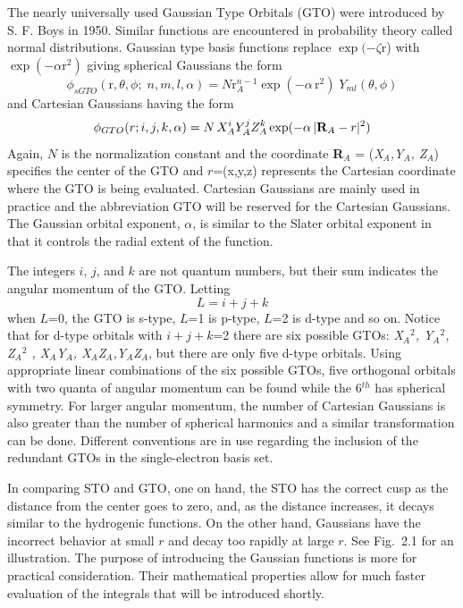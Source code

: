 \documentclass[11pt,oneside,final]{huthesis}%
\begin{document}
The nearly universally used Gaussian Type Orbitals (GTO) were introduced by S. F. Boys in 1950.  Similar functions are encountered in probability theory called normal distributions.  Gaussian type basis functions replace $\exp(-\zeta $r) with $\exp(-\alpha \textrm{r}^{2})$ giving spherical Gaussians the form 
\begin{equation*} %
	\phi _{sGTO} (\textrm{r},\theta ,\phi ;\; n,m,l,\alpha )=N\textrm{r}_{A}^{n-1} \exp (-\alpha \, \textrm{r}^{2} )\; Y_{ml} (\theta ,\phi ) 
\end{equation*} 
 and Cartesian Gaussians having the form
\begin{equation*} %
\phi _{GTO} ({ r};i,j,k,\alpha )=N\, X_{A}^{i} Y_{A}^{j} Z_{A}^{k} \exp (-\alpha \, |{\bf R}_{A} -{r}|^{2} )
\end{equation*}  
Again, $N$ is the normalization constant and the coordinate \textbf{R}${}_{A}$ = (\textit{X${}_{A}$,Y${}_{A}$, Z${}_{A}$}) specifies the center of the GTO and ${r}$=(x,y,z) represents the Cartesian coordinate where the GTO is being evaluated.  Cartesian Gaussians are mainly used in practice and the abbreviation GTO will be reserved for the Cartesian Gaussians.  The Gaussian orbital exponent, $\alpha$, is similar to the Slater orbital exponent in that it controls the radial extent of the function.   

The integers $i$, $j$, and $k$ are not quantum numbers, but their sum indicates the angular momentum of the GTO.  Letting
\begin{equation} \label{grindeq__7_7_} 
L=i+j+k 
\end{equation} 
when $L$=0, the GTO is s-type, $L$=1 is p-type, $L$=2 is d-type and so on.  Notice that for d-type orbitals with $i+j+k$=2 there are six possible GTOs: \textit{X${}_{A}$${}^{2}$, Y${}_{A}$${}^{2}$, Z${}_{A}$${}^{2}$ , X${}_{A}$Y${}_A$, X${}_{A}$Z${}_{A}$,Y${}_{A}$Z${}_{A}$}, but there are only five d-type orbitals.  Using appropriate linear combinations of the six possible GTOs, five orthogonal orbitals with two quanta of angular momentum can be found while the 6$^{th}$ has spherical symmetry.  For larger angular momentum, the number of Cartesian Gaussians is also greater than the number of spherical harmonics and a similar transformation can be done.  Different conventions are in use regarding the inclusion of the redundant GTOs in the single-electron basis set.  

In comparing STO and GTO, one on hand, the STO has the correct cusp as the distance from the center goes to zero, and, as the distance increases, it decays similar to the hydrogenic functions.   On the other hand, Gaussians have the incorrect behavior at small $r$ and decay too rapidly at large $r$.  See Fig.~2.1 for an illustration.  The purpose of introducing the Gaussian functions is more for practical consideration. Their mathematical properties allow for much faster evaluation of the integrals that will be introduced shortly.
\end{document}
